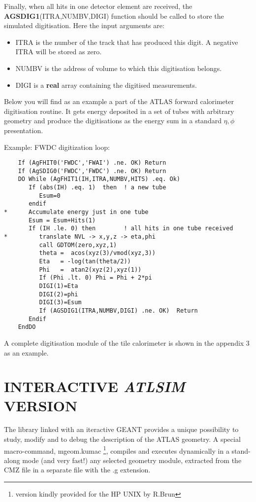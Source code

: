 Finally, when all hits in one detector element are received, 
the {\bf AGSDIG1}(ITRA,NUMBV,DIGI) function should be called
to store the simulated digitisation.
Here  the input arguments are:
\begin{itemize}
\item 
ITRA is the number of the track that has produced this digit.
A negative ITRA will be stored as zero.
\item
NUMBV is the address of volume to which this digitisation belongs.
\item 
DIGI is a {\bf real } array containing the digitised measurements. 
\end{itemize}

Below you will find as an example  a part of
the ATLAS forward calorimeter digitisation routine.
It gets energy deposited in a set of tubes 
with arbitrary geometry and produce the  digitisations
as the energy sum in a standard $\eta,\phi$ presentation. 

\vspace{0.3cm} Example: FWDC digitization loop:
\begin{verbatim}
    If (AgFHIT0('FWDC','FWAI') .ne. OK) Return
    If (AgSDIG0('FWDC','FWDC') .ne. OK) Return
    DO While (AgFHIT1(IH,ITRA,NUMBV,HITS) .eq. Ok)
       If (abs(IH) .eq. 1)  then  ! a new tube
          Esum=0
       endif
*      Accumulate energy just in one tube
       Esum = Esum+Hits(1)
       If (IH .le. 0) then        ! all hits in one tube received
*         translate NVL -> x,y,z -> eta,phi
          call GDTOM(zero,xyz,1)
          theta =  acos(xyz(3)/vmod(xyz,3))
          Eta   = -log(tan(theta/2))
          Phi   =  atan2(xyz(2),xyz(1))
          If (Phi .lt. 0) Phi = Phi + 2*pi
          DIGI(1)=Eta
          DIGI(2)=phi
          DIGI(3)=Esum
          If (AGSDIG1(ITRA,NUMBV,DIGI) .ne. OK)  Return
       Endif
    EndDO
\end{verbatim}

A complete digitisation module of the tile calorimeter 
is shown in the appendix 3 as an example.

\section{INTERACTIVE {\it ATLSIM } VERSION}

The \as library linked with an iteractive GEANT
provides a unique possibility to study, modify and  to debug
the description of the ATLAS geometry.
A special macro-command, mgeom.kumac 
\footnote{version kindly provided for the HP UNIX by R.Brun},
compiles and executes dynamically in a stand-along mode (and very fast!)
any selected geometry module, extracted from the CMZ file 
in a separate file with the .g extension.

